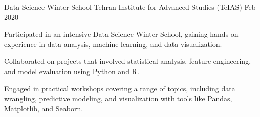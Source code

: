 \begin{cventries}
	
	\cventry
	{Data Science Winter School} %
	{Tehran Institute for Advanced Studies (TeIAS)} %
	{\textcolor{neutraltext}{Feb 2020}} %
	{} %
	{
		\begin{cvitems} %
			\item Participated in an intensive Data Science Winter School, gaining hands-on experience in data analysis, machine learning, and data visualization.
			\item Collaborated on projects that involved statistical analysis, feature engineering, and model evaluation using Python and R.
			\item Engaged in practical workshops covering a range of topics, including data wrangling, predictive modeling, and visualization with tools like Pandas, Matplotlib, and Seaborn.
		\end{cvitems}
	}
	
	
\end{cventries}
